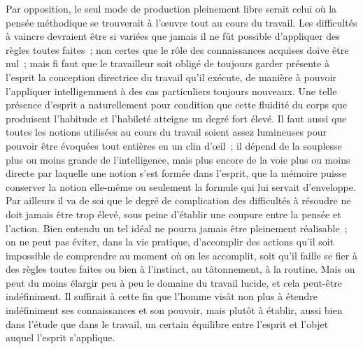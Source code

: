 \documentclass[french,twoside]{book} %
\begin{document}
Par opposition, le seul mode de production pleinement libre serait celui où la pensée méthodique se trouverait à l'œuvre tout au cours du travail. Les difficultés à vaincre devraient être si variées que jamais il ne fût possible d'appliquer des règles toutes faites ; non certes que le rôle des connaissances acquises doive être nul ; mais fi faut que le travailleur soit obligé de toujours garder présente à l'esprit la conception directrice du travail qu'il exécute, de manière à pouvoir l'appliquer intelligemment à des cas particuliers toujours nouveaux. Une telle présence d'esprit a naturellement pour condition que cette fluidité du corps que produisent l'habitude et l'habileté atteigne un degré fort élevé. Il faut aussi que toutes les notions utilisées au cours du travail soient assez lumineuses pour pouvoir être évoquées tout entières en un clin d'œil ; il dépend de la souplesse plus ou moins grande de l'intelligence, mais plus encore de la voie plus ou moins directe par laquelle une notion s'est formée dans l'esprit, que la mémoire puisse conserver la notion elle-même ou seulement la formule qui lui servait d'enveloppe. Par ailleurs il va de soi que le degré de complication des difficultés à résoudre ne doit jamais être trop élevé, sous peine d'établir une coupure entre la pensée et l'action. Bien entendu un tel idéal ne pourra jamais être pleinement réalisable ; on ne peut pas éviter, dans la vie pratique, d'accomplir des actions qu'il soit impossible de comprendre au moment où on les accomplit, soit qu'il faille se fier à des règles toutes faites ou bien à l'instinct, au tâtonnement, à la routine. Mais on peut du moins élargir peu à peu le domaine du travail lucide, et cela peut-être indéfiniment. Il suffirait à cette fin que l'homme visât non plus à étendre indéfiniment ses connaissances et son pouvoir, mais plutôt à établir, aussi bien dans l'étude que dans le travail, un certain équilibre entre l'esprit et l'objet auquel l'esprit s'applique.\par
\end{document}
